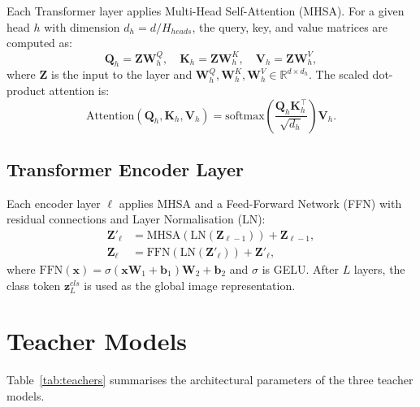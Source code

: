 \documentclass[journal]{IEEEtran}
\begin{document}
Each Transformer layer applies Multi-Head Self-Attention (MHSA). For a given head $h$ with
dimension $d_h = d / H_{heads}$, the query, key, and value matrices are computed as:
\begin{equation}
    \mathbf{Q}_h = \mathbf{Z}\mathbf{W}_h^Q,\quad
    \mathbf{K}_h = \mathbf{Z}\mathbf{W}_h^K,\quad
    \mathbf{V}_h = \mathbf{Z}\mathbf{W}_h^V,
\end{equation}
where $\mathbf{Z}$ is the input to the layer and
$\mathbf{W}_h^Q, \mathbf{W}_h^K, \mathbf{W}_h^V \in \mathbb{R}^{d \times d_h}$.
The scaled dot-product attention is:
\begin{equation}
    \text{Attention}(\mathbf{Q}_h, \mathbf{K}_h, \mathbf{V}_h) =
    \text{softmax}\!\left(\frac{\mathbf{Q}_h \mathbf{K}_h^\top}{\sqrt{d_h}}\right)\mathbf{V}_h.
    \label{eq:attention}
\end{equation}

\subsection{Transformer Encoder Layer}

Each encoder layer $\ell$ applies MHSA and a Feed-Forward Network (FFN) with residual connections
and Layer Normalisation (LN):
\begin{align}
    \mathbf{Z}'_\ell &= \text{MHSA}(\text{LN}(\mathbf{Z}_{\ell-1})) + \mathbf{Z}_{\ell-1}, \\
    \mathbf{Z}_\ell  &= \text{FFN}(\text{LN}(\mathbf{Z}'_\ell)) + \mathbf{Z}'_\ell,
\end{align}
where $\text{FFN}(\mathbf{x}) = \sigma(\mathbf{x}\mathbf{W}_1 + \mathbf{b}_1)\mathbf{W}_2 + \mathbf{b}_2$
and $\sigma$ is GELU. After $L$ layers, the class token
$\mathbf{z}_L^{cls}$ is used as the global image representation.

\section{Teacher Models}
\label{sec:teachers}

Table~\ref{tab:teachers} summarises the architectural parameters of the three teacher models.
\end{document}
